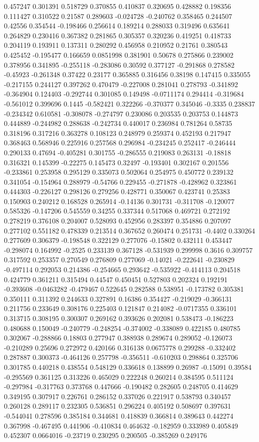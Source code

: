 0.457247 0.301391 0.518729 0.370855 0.410837 0.320695 0.428882 0.198356 0.111427 0.310522 0.21587 0.289603 -0.024728 -0.240762 0.358465 0.244507 0.42556 0.354544 -0.198466 0.256614 0.189214 0.288033 0.319496 0.635641 0.264829 0.230416 0.367382 0.281865 0.305357 0.320236 0.419251 0.418733 0.204119 0.193911 0.137311 0.280292 0.456958 0.210952 0.21761 0.380543 0.425452 -0.195477 0.166659 0.0851998 0.381901 0.50678 0.275866 0.239002 0.378956 0.341895 -0.255118 -0.283086 0.30592 0.377127 -0.291868 0.278582 -0.45923 -0.261348 0.37422 0.23177 0.365885 0.316456 0.38198 0.147415 0.335055 -0.217155 0.244127 0.397262 0.470479 -0.227008 0.281041 0.278793 -0.341892 -0.364904 0.124403 -0.292744 0.301085 0.149498 -0.0711174 0.294414 -0.319684 -0.561012 0.399696 0.1445 -0.582421 0.322266 -0.370377 0.345046 -0.3335 0.238837 -0.234342 0.610581 -0.308078 -0.274797 0.230086 0.203535 0.203753 0.144873 0.444889 -0.244982 0.288638 -0.242734 0.440017 0.236984 0.781264 0.58735 0.318196 0.317216 0.363278 0.108123 0.248979 0.259374 0.452193 0.217947 0.368463 0.568946 0.225916 0.257568 0.296984 -0.234245 0.252417 -0.246444 0.290133 0.47694 -0.405281 0.301755 -0.286555 0.219083 0.263131 -0.18818 0.316321 0.145399 -0.22275 0.145473 0.32497 -0.193401 0.302167 0.201556 -0.233861 0.253958 0.295129 0.335073 0.502064 0.254975 0.450772 0.239132 0.341054 -0.154964 0.288979 -0.54766 0.229455 -0.271878 -0.428962 0.323861 0.444303 -0.226127 0.298126 0.279256 0.428771 0.350067 0.423741 0.25383 0.150903 0.240212 0.168528 0.265914 -0.14136 0.301731 -0.311708 -0.120077 0.585326 -0.147206 0.545559 0.34255 0.337344 0.517068 0.469721 0.272192 0.278219 0.376108 0.204007 0.528093 0.452956 0.283397 0.354886 0.207097 0.277102 0.551182 0.478339 0.213514 0.367652 0.260474 0.251731 -0.4402 0.330264 0.277609 0.306379 -0.198548 0.322129 0.277076 -0.15802 0.432111 0.453447 -0.298074 0.164992 -0.2525 0.233139 0.367128 -0.531939 0.299998 0.3616 0.309757 0.317592 0.253357 0.270549 0.276809 0.277069 -0.14021 -0.222641 -0.230829 -0.497114 0.292053 0.214386 -0.254665 0.293642 -0.535922 -0.414113 0.204518 0.424779 0.361211 0.315494 0.44547 0.450451 0.527803 0.202324 0.192191 -0.393608 -0.0463282 -0.479467 0.522645 0.282588 0.538951 -0.173782 0.305381 0.350111 0.311392 0.244633 0.327891 0.16386 0.354427 -0.219029 -0.366131 0.211756 0.233649 0.308176 0.225403 0.121847 0.214082 -0.0717355 0.336101 0.313715 0.308195 0.300307 0.269162 0.393626 0.202081 0.538473 -0.186223 0.480688 0.150049 -0.240779 -0.248254 -0.374002 -0.338089 0.422185 0.480785 0.302067 -0.288866 0.18803 0.277947 0.388938 0.289674 0.289052 -0.126073 -0.210289 0.25696 0.272972 0.420166 0.316138 0.0675778 0.299288 -0.332402 0.287887 0.300373 -0.464126 0.257798 -0.356511 -0.610203 0.298864 0.325706 0.301785 0.440218 0.438554 0.548129 0.336618 0.138899 0.26987 -0.15091 0.39584 -0.295569 0.361125 0.313226 0.465029 0.222248 0.260214 0.384595 0.511124 -0.297984 -0.317763 0.373768 0.447666 -0.190482 0.282605 0.248705 0.414629 0.349195 0.307917 0.226761 0.286152 0.337026 0.221917 0.538793 0.340457 0.260128 0.289117 0.232305 0.536851 0.296224 0.405192 0.508697 0.397631 -0.544041 0.278596 0.385184 0.344681 0.418839 0.366814 0.389643 0.442274 0.367998 -0.467495 0.441906 -0.410834 0.464632 -0.182959 0.333989 0.405849 0.452307 0.0664016 -0.23719 0.230295 0.200505 -0.385269 0.249176 
